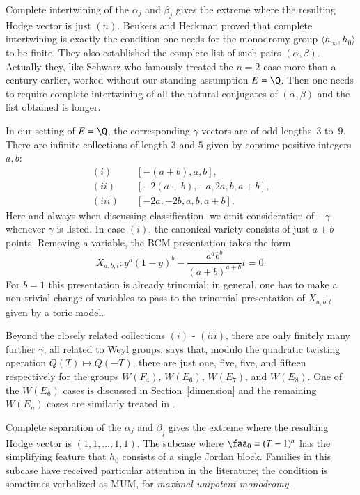 \documentclass{notices}
\numberwithin{equation}{section}
\numberwithin{table}{section}
\numberwithin{figure}{section}
\begin{document}
{  Complete intertwining
of the $\alpha_j$ and $\beta_j$ gives the extreme where the
resulting Hodge vector is just $(n)$.  Beukers and Heckman
\cite{BH} proved that complete intertwining is exactly the condition 
one needs for the monodromy group $\langle h_\infty,h_0 \rangle$
to be finite.  They also established the complete list of such
pairs $(\alpha,\beta)$.  Actually they, like Schwarz 
who famously treated the $n=2$ case more than a century earlier,
worked without our standing assumption $E=\Q$.  Then one 
needs to require complete intertwining of 
all the natural conjugates of $(\alpha,\beta)$ and the list obtained is longer.  

In our setting of $E=\Q$, the corresponding $\gamma$-vectors are of odd lengths~$3$
to~$9$.  There are infinite collections of length $3$ and $5$ given
by coprime positive integers $a,b$: 
\begin{align}
(i)&\quad[-(a+b),a,b], \label{123}  \\
(ii)&\quad[-2(a+b),-a,2a,b,a+b], \nonumber \\
(iii)&\quad[-2a,-2b,a,b,a+b] \nonumber.
\end{align}
Here and always when discussing classification, we omit consideration
of $-\gamma$ whenever $\gamma$ is listed.  
In case $(i)$, the canonical variety consists of just $a+b$ points. 
Removing a variable, the BCM presentation takes the form 
$$
X_{a,b,t}: y^a(1-y)^b-\frac{a^ab^b}{(a+b)^{a+b}}t=0.
$$
For $b=1$ this presentation is already trinomial; in
general, one has to make a non-trivial change of variables
to pass to the trinomial presentation of $X_{a,b,t}$ given by a toric model.     

Beyond the closely related collections $(i)$ - $(iii)$, there 
are only finitely many further $\gamma$, all related
to Weyl groups.  \cite[Table~8.3]{BH} says that,
modulo the quadratic twisting operation $Q(T) \mapsto Q(-T)$, there are  just
one, five, five, and fifteen respectively for the groups
$W(F_4)$, $W(E_6)$, $W(E_7)$, and $W(E_8)$.  
One of the $W(E_6)$ cases is discussed in Section~\ref{dimension}
and the remaining $W(E_n)$ cases are 
similarly treated in \cite{Rob-polys}.  

 Complete
separation of the $\alpha_j$ and $\beta_j$ gives the
extreme where the resulting Hodge vector is
$(1,1,\dots,1,1)$.  The subcase where
$\faa_0=(T-1)^n$ has the simplifying feature 
that $h_0$ consists of a single Jordan block. 
Families in this subcase have received 
particular attention in the literature; the condition
is sometimes verbalized as MUM, for {\em maximal unipotent monodromy}.    

}
\end{document}
